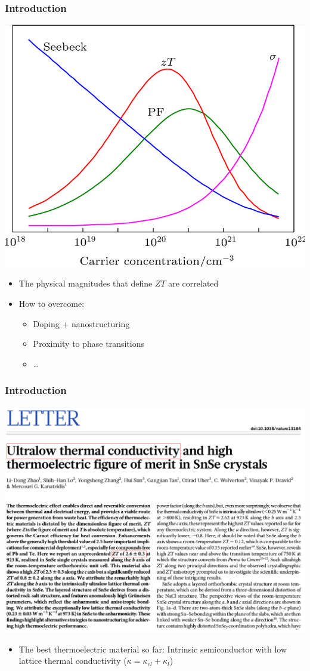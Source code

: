 \documentclass{beamer}
\begin{document}

\begin{frame}

\frametitle{Introduction}
\vspace{-0.5cm}
\begin{center}
\includegraphics[width=0.5\linewidth]{Pictures/INTRO/decoupling.png}
\end{center}
\vspace{-0.1cm}
\begin{itemize}
\item The physical magnitudes that define $ZT$ are correlated
\item How to overcome:
	\begin{itemize}
	\item Doping + nanostructuring
	\item Proximity to phase transitions
	\item \dots
	\end{itemize}
\end{itemize}

\end{frame}


\begin{frame}

\frametitle{Introduction}
\vspace{-0.5cm}
\begin{center}
\includegraphics[width=0.7\linewidth]{Pictures/INTRO/natureSnSe.pdf}
\end{center}
\begin{itemize}
\item The best thermoelectric material so far: Intrinsic semiconductor with low lattice thermal 
conductivity ($\kappa=\kappa_{el} + \kappa_{l}$) 
\end{itemize}

\end{frame}
\end{document}
